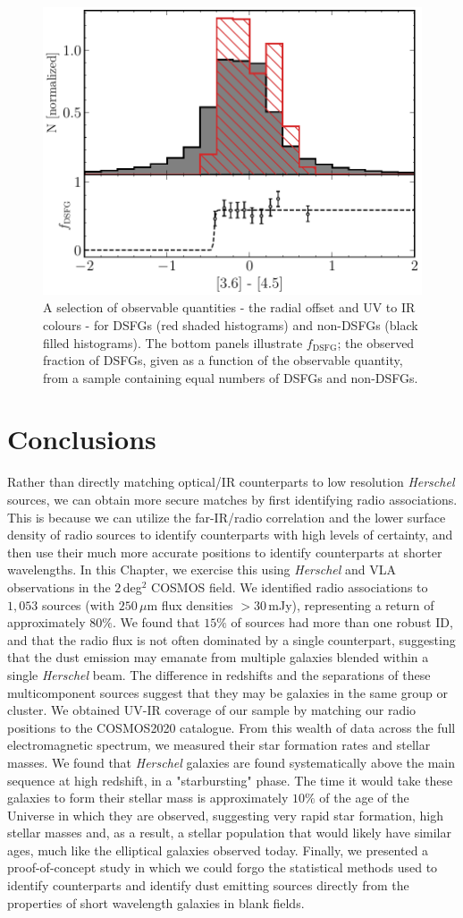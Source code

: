 \begin{figure}
	\includegraphics[width=0.49\columnwidth, height=0.25\textheight]{Figures/3645_smg.pdf}
	\caption[Historgams of DSFGs compared to non-DSFGs in COSMOS]{A selection of observable quantities - the radial offset and UV to IR colours - for DSFGs (red shaded histograms) and non-DSFGs (black filled histograms). The bottom panels illustrate $f_\textrm{DSFG}$; the observed fraction of DSFGs, given as a function of the observable quantity, from a sample containing equal numbers of DSFGs and non-DSFGs.}
	\label{fig:smg_nonsmg}
\end{figure}

\section{Conclusions}

Rather than directly matching optical/IR counterparts to low resolution \textit{Herschel} sources, we can obtain more secure matches by first identifying radio associations. This is because we can utilize the far-IR/radio correlation and the lower surface density of radio sources to identify counterparts with high levels of certainty, and then use their much more accurate positions to identify counterparts at shorter wavelengths. In this Chapter, we exercise this using \textit{Herschel} and VLA observations in the $2\,$deg$^2$ COSMOS field. We identified radio associations to $1,053$ sources (with $250\,\mu$m flux densities $> 30\,$mJy), representing a return of approximately $80\%$. We found that $15\%$ of sources had more than one robust ID, and that the radio flux is not often dominated by a single counterpart, suggesting that the dust emission may emanate from multiple galaxies blended within a single \textit{Herschel} beam. The difference in redshifts and the separations of these multicomponent sources suggest that they may be galaxies in the same group or cluster. We obtained UV-IR coverage of our sample by matching our radio positions to the COSMOS2020 catalogue. From this wealth of data across the full electromagnetic spectrum, we measured their star formation rates and stellar masses. We found that \textit{Herschel} galaxies are found systematically above the main sequence at high redshift, in a "starbursting" phase. The time it would take these galaxies to form their stellar mass is approximately $10\%$ of the age of the Universe in which they are observed, suggesting very rapid star formation, high stellar masses and, as a result, a stellar population that would likely have similar ages, much like the elliptical galaxies observed today. Finally, we presented a proof-of-concept study in which we could forgo the statistical methods used to identify counterparts and identify dust emitting sources directly from the properties of short wavelength galaxies in blank fields.
